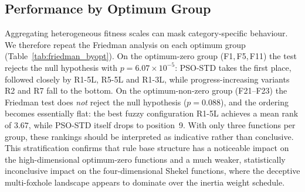 \documentclass[runningheads]{llncs}
\begin{document}
 





\subsection{Performance by Optimum Group}\label{sec:results_optgroup}

Aggregating heterogeneous fitness scales can mask category-specific behaviour. We therefore repeat the Friedman analysis on each optimum group (Table~\ref{tab:friedman_byopt}). On the optimum-zero group (F1,\,F5,\,F11) the test rejects the null hypothesis with $p = 6.07\times 10^{-5}$: PSO-STD takes the first place, followed closely by R1-5L, R5-5L and R1-3L, while progress-increasing variants R2 and R7 fall to the bottom. On the optimum-non-zero group (F21--F23) the Friedman test does \emph{not} reject the null hypothesis ($p = 0.088$), and the ordering becomes essentially flat: the best fuzzy configuration R1-5L achieves a mean rank of $3.67$, while PSO-STD itself drops to position~9. With only three functions per group, these rankings should be interpreted as indicative rather than conclusive. This stratification confirms that rule base structure has a noticeable impact on the high-dimensional optimum-zero functions and a much weaker, statistically inconclusive impact on the four-dimensional Shekel functions, where the deceptive multi-foxhole landscape appears to dominate over the inertia weight schedule.
\end{document}
